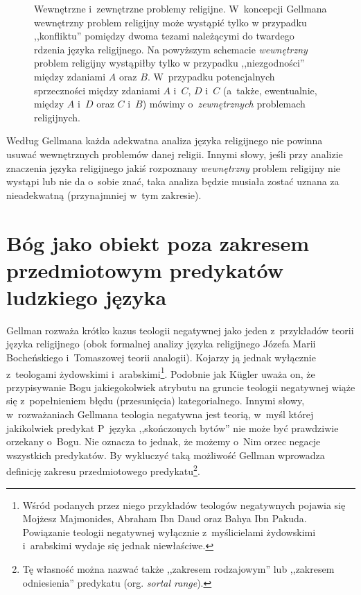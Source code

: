 \begin{figure}[H]
\begin{center}

\caption[Wewnętrzne i~zewnętrzne problemy religijne według Gellmana]{Wewnętrzne i~zewnętrzne problemy religijne. W~koncepcji Gellmana wewnętrzny problem religijny może wystąpić tylko w przypadku ,,konfliktu'' pomiędzy dwoma tezami należącymi do twardego rdzenia języka religijnego. Na powyższym schemacie \textit{wewnętrzny} problem religijny wystąpiłby tylko w przypadku ,,niezgodności'' między zdaniami $A$ oraz $B$. W~przypadku potencjalnych sprzeczności między zdaniami $A$ i~$C$, $D$ i~$C$ (a~także, ewentualnie, między $A$ i~$D$ oraz $C$ i~$B$) mówimy o~\textit{zewnętrznych} problemach religijnych.}\label{sil-gell-prob}
\end{center}
\end{figure}

Według Gellmana każda adekwatna analiza języka religijnego nie powinna usuwać wewnętrznych problemów danej religii. Innymi słowy, jeśli przy analizie znaczenia języka religijnego jakiś rozpoznany \textit{wewnętrzny} problem religijny nie wystąpi lub nie da o~sobie znać, taka analiza będzie musiała zostać uznana za nieadekwatną (przynajmniej w~tym zakresie).


\section{Bóg jako obiekt poza zakresem przedmiotowym predykatów ludzkiego języka}

Gellman rozważa krótko kazus teologii negatywnej jako jeden z~przykładów teorii języka religijnego (obok formalnej analizy języka religijnego Józefa Marii Bocheńskiego i~Tomaszowej teorii analogii). Kojarzy ją jednak wyłącznie z~teologami żydowskimi i~arabskimi\footnote{Wśród podanych przez niego przykładów teologów negatywnych pojawia się Mojżesz Majmonides, Abraham Ibn Daud oraz Bahya Ibn Pakuda. Powiązanie teologii negatywnej wyłącznie z~myślicielami żydowskimi i~arabskimi wydaje się jednak niewłaściwe.}. Podobnie jak Kügler uważa on, że przypisywanie Bogu jakiegokolwiek atrybutu na gruncie teologii negatywnej wiąże się z~popełnieniem błędu (przesunięcia) kategorialnego. Innymi słowy, w~rozważaniach Gellmana teologia negatywna jest teorią, w~myśl której jakikolwiek predykat P~języka ,,skończonych bytów'' nie może być prawdziwie orzekany o~Bogu. Nie oznacza to jednak, że możemy o~Nim orzec negacje wszystkich predykatów. By wykluczyć taką możliwość Gellman wprowadza definicję zakresu przedmiotowego predykatu\footnote{Tę własność można nazwać także ,,zakresem rodzajowym'' lub ,,zakresem odniesienia'' predykatu (org. \textit{sortal range}).}.

